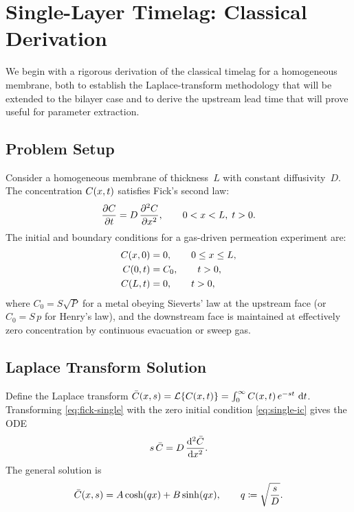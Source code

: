 \section{Single-Layer Timelag: Classical Derivation}
\label{sec:single-layer}

We begin with a rigorous derivation of the classical timelag for a homogeneous
membrane, both to establish the Laplace-transform methodology that will be
extended to the bilayer case and to derive the upstream lead time that will
prove useful for parameter extraction.

\subsection{Problem Setup}
\label{sec:single-setup}

Consider a homogeneous membrane of thickness~$L$ with constant
diffusivity~$D$.  The concentration $C(x,t)$ satisfies Fick's second law:
\begin{equation}
  \label{eq:fick-single}
  \pdv{C}{t} = D\,\pdv[2]{C}{x}, \qquad 0 < x < L,\; t > 0.
\end{equation}
The initial and boundary conditions for a gas-driven permeation experiment are:
\begin{align}
  \label{eq:single-ic}
  C(x,0) &= 0, \qquad 0 \le x \le L, \\
  \label{eq:single-bc-up}
  C(0,t) &= C_0, \qquad t > 0, \\
  \label{eq:single-bc-down}
  C(L,t) &= 0, \qquad t > 0,
\end{align}
where $C_0 = S\sqrt{P}$ for a metal obeying Sieverts' law at the upstream face
(or $C_0 = S\,p$ for Henry's law), and the downstream face is maintained at
effectively zero concentration by continuous evacuation or sweep gas.

\subsection{Laplace Transform Solution}
\label{sec:single-laplace}

Define the Laplace transform
$\bar{C}(x,s) = \mathcal{L}\{C(x,t)\} = \int_0^\infty C(x,t)\,
e^{-st}\,\dd{t}$.  Transforming \cref{eq:fick-single} with the zero initial
condition \cref{eq:single-ic} gives the ODE
\begin{equation}
  \label{eq:single-ode-laplace}
  s\,\bar{C} = D\,\dv[2]{\bar{C}}{x}.
\end{equation}
The general solution is
\begin{equation}
  \label{eq:single-general-soln}
  \bar{C}(x,s) = A\cosh(qx) + B\sinh(qx),
  \qquad q \coloneqq \sqrt{\frac{s}{D}}.
\end{equation}

